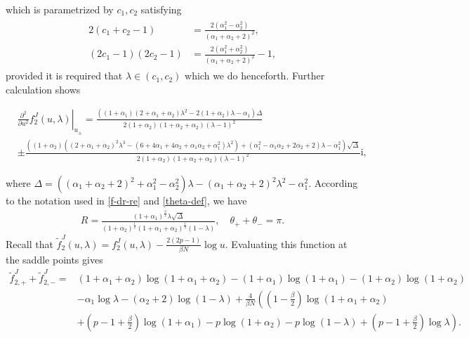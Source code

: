 \documentclass[11pt,a4paper]{article}
\numberwithin{equation}{section} %
\theoremstyle{plain}
\theoremstyle{definition}
\numberwithin{prop}{section}
\numberwithin{cor}{section}
\numberwithin{remark}{section}
\begin{document}
which is parametrized by $c_1,c_2$ satisfying
\begin{align}\label{c1c2}
    \begin{aligned}
2\left(c_1+c_2-1\right) & =\frac{2\left(\alpha_1^2-\alpha_2^2\right)}{\left(\alpha_1+\alpha_2+2\right)^2}, \\
\left(2 c_1-1\right)\left(2 c_2-1\right) & =\frac{2\left(\alpha_1^2+\alpha_2^2\right)}{\left(\alpha_1+\alpha_2+2\right)^2}-1,
\end{aligned}
\end{align}
provided it is required that $\lambda \in (c_1,c_2)$ which we do henceforth.
Further calculation shows
\begin{small}
    \begin{align}
    &\left.\frac{\partial^2}{\partial u^2}f_2^J(u,\lambda)\right|_{u_\pm}=\frac{((1+\alpha_1)(2+\alpha_1+\alpha_2)\lambda^2-2(1+\alpha_2)\lambda-\alpha_1)\Delta}{2(1+\alpha_2)(1+\alpha_2+\alpha_2)(\lambda-1)^2}\\
    &\pm\frac{((1+\alpha_2)((2+\alpha_1+\alpha_2)^2\lambda^3-(6+4\alpha_1+4\alpha_2+\alpha_1\alpha_2+\alpha_1^2)\lambda^2)+(\alpha_1^2-\alpha_1\alpha_2+2\alpha_2+2)\lambda-\alpha_1^2)\sqrt{\Delta}}{2(1+\alpha_2)(1+\alpha_2+\alpha_2)(\lambda-1)^2}\mathrm{i},
\end{align}
\end{small}
where $\Delta=((\alpha_1+\alpha_2+2)^2+\alpha_1^2-\alpha_2^2)\lambda-(\alpha_1+\alpha_2+2)^2\lambda^2-\alpha_1^2$. According to the notation used in \eqref{f-dr-re} and \eqref{theta-def}, we have
\begin{align}
    R=\frac{(1+\alpha_1)^{\frac{3}{2}}\lambda\sqrt{\Delta}}{(1+\alpha_2)^{\frac{1}{2}}(1+\alpha_1+\alpha_2)^{\frac{1}{2}}(1-\lambda)},\quad \theta_++\theta_-=\pi.
\end{align}
Recall that $\tilde{f}_2^J(u,\lambda)=f_2^J(u,\lambda)-\frac{2(2p-1)}{\beta N}\log u$. Evaluating this function at the saddle points gives
\begin{align*}
    \tilde{f}_{2,+}^J+\tilde{f}_{2,-}^J=&(1+\alpha_1+\alpha_2)\log (1+\alpha_1+\alpha_2)-(1+\alpha_1)\log(1+\alpha_1)-(1+\alpha_2)\log(1+\alpha_2)\\
    &-\alpha_1\log \lambda-(\alpha_2+2)\log(1-\lambda)+\frac{4}{\beta N}\left(\left(1-\frac{\beta}{2}\right)\log(1+\alpha_1+\alpha_2)\right.\\
    &+\left.\left(p-1+\frac{\beta}{2}\right)\log(1+\alpha_1)-p\log(1+\alpha_2)-p\log(1-\lambda)+\left(p-1+\frac{\beta}{2}\right)\log\lambda\right).
\end{align*}
\end{document}
